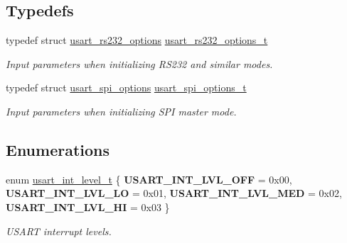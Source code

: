 \subsection*{Typedefs}
\begin{DoxyCompactItemize}
\item 
\hypertarget{group__usart__group_ga7ef7b0c900cfe5c657ed5dd41170091d}{typedef struct \hyperlink{structusart__rs232__options}{usart\-\_\-rs232\-\_\-options} \hyperlink{group__usart__group_ga7ef7b0c900cfe5c657ed5dd41170091d}{usart\-\_\-rs232\-\_\-options\-\_\-t}}\label{group__usart__group_ga7ef7b0c900cfe5c657ed5dd41170091d}

\begin{DoxyCompactList}\small\item\em Input parameters when initializing R\-S232 and similar modes. \end{DoxyCompactList}\item 
\hypertarget{group__usart__group_gaf687857c26a3ebf13a9e63767efe9e9c}{typedef struct \hyperlink{structusart__spi__options}{usart\-\_\-spi\-\_\-options} \hyperlink{group__usart__group_gaf687857c26a3ebf13a9e63767efe9e9c}{usart\-\_\-spi\-\_\-options\-\_\-t}}\label{group__usart__group_gaf687857c26a3ebf13a9e63767efe9e9c}

\begin{DoxyCompactList}\small\item\em Input parameters when initializing S\-P\-I master mode. \end{DoxyCompactList}\end{DoxyCompactItemize}
\subsection*{Enumerations}
\begin{DoxyCompactItemize}
\item 
enum \hyperlink{group__usart__group_gaf84fb6b93a9290f76ae44accf36469f7}{usart\-\_\-int\-\_\-level\-\_\-t} \{ {\bfseries U\-S\-A\-R\-T\-\_\-\-I\-N\-T\-\_\-\-L\-V\-L\-\_\-\-O\-F\-F} =  0x00, 
{\bfseries U\-S\-A\-R\-T\-\_\-\-I\-N\-T\-\_\-\-L\-V\-L\-\_\-\-L\-O} =  0x01, 
{\bfseries U\-S\-A\-R\-T\-\_\-\-I\-N\-T\-\_\-\-L\-V\-L\-\_\-\-M\-E\-D} =  0x02, 
{\bfseries U\-S\-A\-R\-T\-\_\-\-I\-N\-T\-\_\-\-L\-V\-L\-\_\-\-H\-I} =  0x03
 \}
\begin{DoxyCompactList}\small\item\em U\-S\-A\-R\-T interrupt levels. \end{DoxyCompactList}\end{DoxyCompactItemize}
